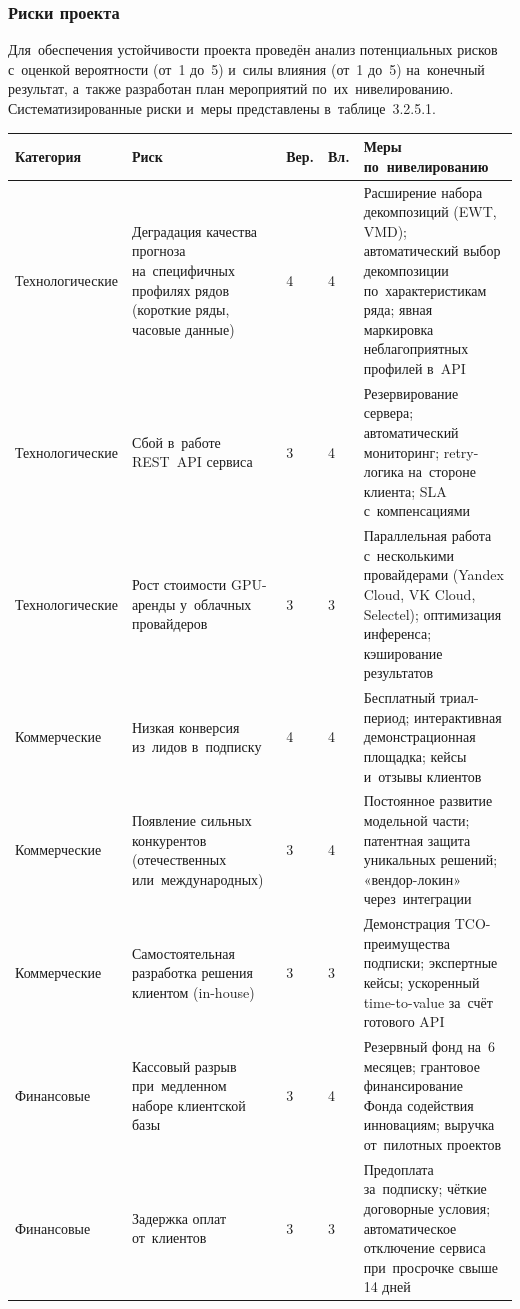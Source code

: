 \subsubsection{Риски проекта}

Для~обеспечения устойчивости проекта проведён анализ потенциальных рисков
с~оценкой вероятности (от~1 до~5) и~силы влияния (от~1 до~5) на~конечный
результат, а~также разработан план мероприятий по~их~нивелированию.
Систематизированные риски и~меры представлены в~таблице~3.2.5.1.

{\footnotesize
\begin{longtable}{L{2.0cm} L{4.2cm} C{0.9cm} C{0.9cm} L{6.0cm}}
\toprule
Категория & Риск & Вер. & Вл. & Меры по~нивелированию \\
\midrule
\endhead
Технологические & Деградация качества прогноза на~специфичных профилях рядов (короткие ряды, часовые данные) & 4 & 4 & Расширение набора декомпозиций (EWT, VMD); автоматический выбор декомпозиции по~характеристикам ряда; явная маркировка неблагоприятных профилей в~API \\
\midrule
Технологические & Сбой в~работе REST~API сервиса & 3 & 4 & Резервирование сервера; автоматический мониторинг; retry-логика на~стороне клиента; SLA с~компенсациями \\
\midrule
Технологические & Рост стоимости GPU-аренды у~облачных провайдеров & 3 & 3 & Параллельная работа с~несколькими провайдерами (Yandex Cloud, VK Cloud, Selectel); оптимизация инференса; кэширование результатов \\
\midrule
Коммерческие & Низкая конверсия из~лидов в~подписку & 4 & 4 & Бесплатный триал-период; интерактивная демонстрационная площадка; кейсы и~отзывы клиентов \\
\midrule
Коммерческие & Появление сильных конкурентов (отечественных или~международных) & 3 & 4 & Постоянное развитие модельной части; патентная защита уникальных решений; «вендор-локин» через~интеграции \\
\midrule
Коммерческие & Самостоятельная разработка решения клиентом (in-house) & 3 & 3 & Демонстрация TCO-преимущества подписки; экспертные кейсы; ускоренный time-to-value за~счёт готового API \\
\midrule
Финансовые & Кассовый разрыв при~медленном наборе клиентской базы & 3 & 4 & Резервный фонд на~6 месяцев; грантовое финансирование Фонда содействия инновациям; выручка от~пилотных проектов \\
\midrule
Финансовые & Задержка оплат от~клиентов & 3 & 3 & Предоплата за~подписку; чёткие договорные условия; автоматическое отключение сервиса при~просрочке свыше 14 дней \\

\end{longtable}}
